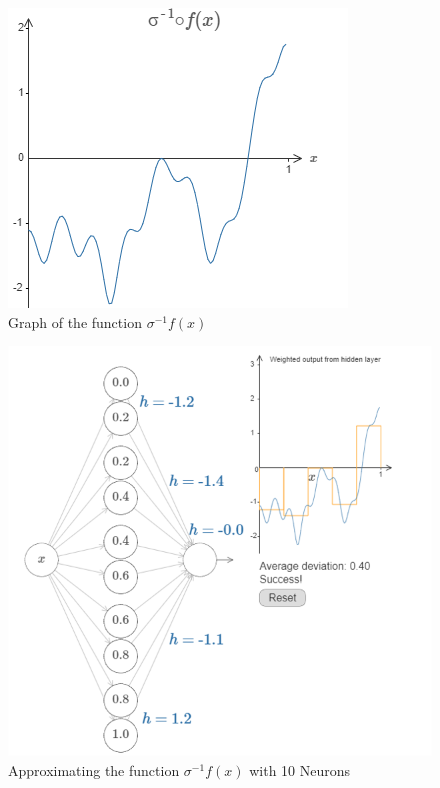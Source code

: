\documentclass{article}
\begin{document}
\newpage

\begin{figure}[h!]
\centering
    \includegraphics[width=0.4 \textwidth]{Images/2/9.png}
    \caption{Graph of the function $\sigma^{-1} f(x)$}
    \label{fig:figure11}
\end{figure}


\begin{figure}[h!]
    \centering
    \includegraphics[width=0.8 \textwidth]{Images/2/7.png}
    \caption{Approximating the function $\sigma^{-1} f(x)$ with 10 Neurons}
    \label{fig:figure12}
\end{figure}

\newpage
\end{document}
